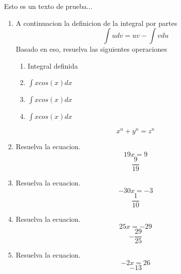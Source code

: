 \documentclass[12pt]{article}%
\begin{document}
%
\normalsize%
\pagestyle{header}%
Esto es un texto de prueba...%
\begin{enumerate}[wide, labelwidth=!, labelindent=0pt,label={Pregunta \arabic*. }]%
\item%
%
A continuacion la definicion de la integral por partes%
\[\int udv=uv-\int vdu\]%
Basado en eso, resuelva las siguientes operaciones%
\begin{enumerate}[wide, labelwidth=!, labelindent=0pt,label={\Alph*) }]%
\item%
%
Integral definida\\%
\item%
%
\(\int xcos(x)dx\)%
\item%
%
\(\int xcos(x)dx\)%
\item%
%
\(\int xcos(x)dx\)%
\end{enumerate}%
\[ x^n + y^n = z^n \]%
\item%
%
Resuelva la ecuacion.%
\begin{equation*}19 x = 9\end{equation*}%
\begin{equation*}\frac{9}{19}\end{equation*}%
\item%
%
Resuelva la ecuacion.%
\begin{equation*}- 30 x = -3\end{equation*}%
\begin{equation*}\frac{1}{10}\end{equation*}%
\item%
%
Resuelva la ecuacion.%
\begin{equation*}25 x = -29\end{equation*}%
\begin{equation*}- \frac{29}{25}\end{equation*}%
\item%
%
Resuelva la ecuacion.%
\begin{equation*}- 2 x = 26\end{equation*}%
\begin{equation*}-13\end{equation*}%
\end{enumerate}%
\end{document}
